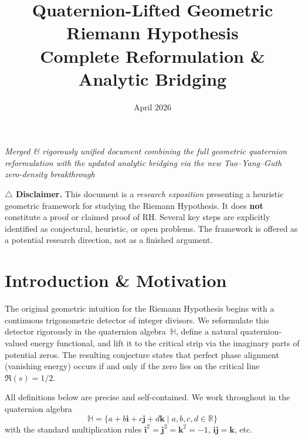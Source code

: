 \documentclass[12pt,a4paper]{article}
\title{Quaternion-Lifted Geometric Riemann Hypothesis\\[6pt]
\large Complete Reformulation \& Analytic Bridging}
\author{}
\date{April 2026}
\newcommand{\HH}{\mathbb{H}}
\newcommand{\RR}{\mathbb{R}}
\newcommand{\ii}{\mathbf{i}}
\newcommand{\jj}{\mathbf{j}}
\newcommand{\kk}{\mathbf{k}}
\begin{document}
\maketitle

\begin{center}
\textit{Merged \& rigorously unified document combining the full geometric quaternion\\
reformulation with the updated analytic bridging via the new Tao--Yang--Guth\\
zero-density breakthrough}
\end{center}

\begin{tcolorbox}[colback=red!5,colframe=red!70,leftrule=6pt,rightrule=2pt,toprule=2pt,bottomrule=2pt,boxsep=5pt]
\textbf{\textcolor{red!70!black}{\large $\triangle$ Disclaimer.}} This document is a \emph{research exposition} presenting a heuristic geometric framework for studying the Riemann Hypothesis. It does \textbf{not} constitute a proof or claimed proof of RH. Several key steps are explicitly identified as conjectural, heuristic, or open problems. The framework is offered as a potential research direction, not as a finished argument.
\end{tcolorbox}

\tableofcontents

\newpage

\section{Introduction \& Motivation}
\label{sec:intro}

The original geometric intuition for the Riemann Hypothesis begins with a continuous trigonometric detector of integer divisors. We reformulate this detector rigorously in the quaternion algebra~$\HH$, define a natural quaternion-valued energy functional, and lift it to the critical strip via the imaginary parts of potential zeros. The resulting conjecture states that perfect phase alignment (vanishing energy) occurs if and only if the zero lies on the critical line $\Re(s) = 1/2$.

All definitions below are precise and self-contained. We work throughout in the quaternion algebra
\[
\HH = \{ a + b\ii + c\jj + d\kk \mid a,b,c,d\in\RR \}
\]
with the standard multiplication rules $\ii^2 = \jj^2 = \kk^2 = -1$, $\ii\jj=\kk$, etc.

\end{document}

